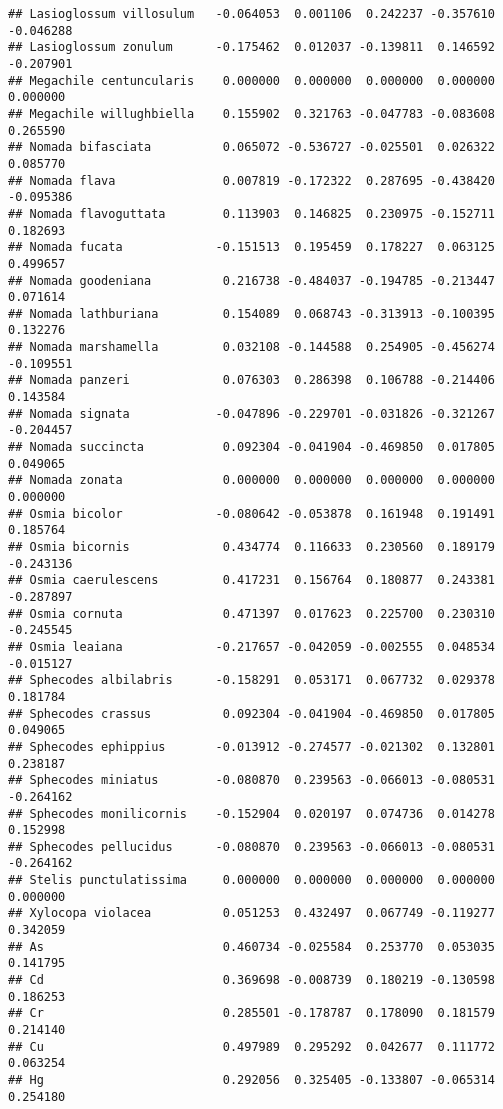 \documentclass[
]{article}
\begin{document}
\begin{verbatim}
## Lasioglossum villosulum   -0.064053  0.001106  0.242237 -0.357610 -0.046288
## Lasioglossum zonulum      -0.175462  0.012037 -0.139811  0.146592 -0.207901
## Megachile centuncularis    0.000000  0.000000  0.000000  0.000000  0.000000
## Megachile willughbiella    0.155902  0.321763 -0.047783 -0.083608  0.265590
## Nomada bifasciata          0.065072 -0.536727 -0.025501  0.026322  0.085770
## Nomada flava               0.007819 -0.172322  0.287695 -0.438420 -0.095386
## Nomada flavoguttata        0.113903  0.146825  0.230975 -0.152711  0.182693
## Nomada fucata             -0.151513  0.195459  0.178227  0.063125  0.499657
## Nomada goodeniana          0.216738 -0.484037 -0.194785 -0.213447  0.071614
## Nomada lathburiana         0.154089  0.068743 -0.313913 -0.100395  0.132276
## Nomada marshamella         0.032108 -0.144588  0.254905 -0.456274 -0.109551
## Nomada panzeri             0.076303  0.286398  0.106788 -0.214406  0.143584
## Nomada signata            -0.047896 -0.229701 -0.031826 -0.321267 -0.204457
## Nomada succincta           0.092304 -0.041904 -0.469850  0.017805  0.049065
## Nomada zonata              0.000000  0.000000  0.000000  0.000000  0.000000
## Osmia bicolor             -0.080642 -0.053878  0.161948  0.191491  0.185764
## Osmia bicornis             0.434774  0.116633  0.230560  0.189179 -0.243136
## Osmia caerulescens         0.417231  0.156764  0.180877  0.243381 -0.287897
## Osmia cornuta              0.471397  0.017623  0.225700  0.230310 -0.245545
## Osmia leaiana             -0.217657 -0.042059 -0.002555  0.048534 -0.015127
## Sphecodes albilabris      -0.158291  0.053171  0.067732  0.029378  0.181784
## Sphecodes crassus          0.092304 -0.041904 -0.469850  0.017805  0.049065
## Sphecodes ephippius       -0.013912 -0.274577 -0.021302  0.132801  0.238187
## Sphecodes miniatus        -0.080870  0.239563 -0.066013 -0.080531 -0.264162
## Sphecodes monilicornis    -0.152904  0.020197  0.074736  0.014278  0.152998
## Sphecodes pellucidus      -0.080870  0.239563 -0.066013 -0.080531 -0.264162
## Stelis punctulatissima     0.000000  0.000000  0.000000  0.000000  0.000000
## Xylocopa violacea          0.051253  0.432497  0.067749 -0.119277  0.342059
## As                         0.460734 -0.025584  0.253770  0.053035  0.141795
## Cd                         0.369698 -0.008739  0.180219 -0.130598  0.186253
## Cr                         0.285501 -0.178787  0.178090  0.181579  0.214140
## Cu                         0.497989  0.295292  0.042677  0.111772  0.063254
## Hg                         0.292056  0.325405 -0.133807 -0.065314  0.254180

\end{verbatim}
\end{document}
